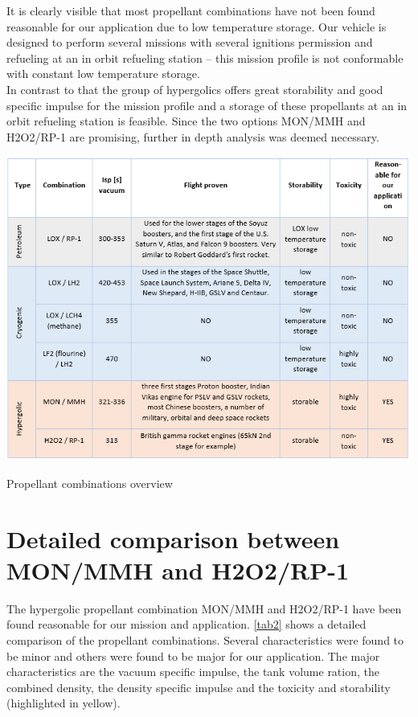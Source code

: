 It is clearly visible that most propellant combinations have not been found reasonable for our application due to low temperature storage. Our vehicle is designed to perform several missions with several ignitions permission and refueling at an in orbit refueling station – this mission profile is not conformable with constant low temperature storage. \\
\clearpage
In contrast to that the group of hypergolics offers great storability and good specific impulse for the mission profile and a storage of these propellants at an in orbit refueling station is feasible. Since the two options MON/MMH and H2O2/RP-1 are promising, further in depth analysis was deemed necessary. 
\begin{table}[H]

	\centering\includegraphics[width=\linewidth]{propcombination}
	
	\caption{Propellant combinations overview}\label{tab1}
\end{table}
\clearpage
\section{Detailed comparison between MON/MMH and H2O2/RP-1}
\qquad The hypergolic propellant combination MON/MMH and H2O2/RP-1 have been found reasonable for our mission and application. \autoref{tab2} shows a detailed comparison of the propellant combinations. Several characteristics were found to be minor and others were found to be major for our application. The major characteristics are the vacuum specific impulse, the tank volume ration, the combined density, the density specific impulse and the toxicity and storability (highlighted in yellow). \\

